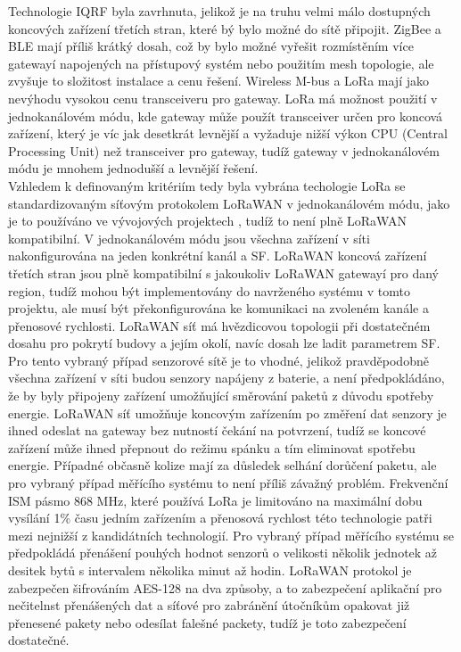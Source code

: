 Technologie IQRF byla zavrhnuta, jelikož je na truhu velmi málo dostupných koncových zařízení třetích stran, které bý bylo možné do sítě připojit. 
ZigBee a BLE mají příliš krátký dosah, což by bylo možné vyřešit rozmístěním více gatewayí napojených na přístupový systém nebo použitím mesh topologie, ale zvyšuje to složitost instalace a cenu řešení. 
Wireless M-bus a LoRa mají jako nevýhodu vysokou cenu transceiveru pro gateway. 
LoRa má možnost použití v jednokanálovém módu, kde gateway může použít transceiver určen pro koncová zařízení, který je víc jak desetkrát levnější a vyžaduje nižší výkon CPU (Central Processing Unit) než transceiver pro gateway, tudíž gateway v jednokanálovém módu je mnohem jednodušší a levnější řešení.
\\
Vzhledem k definovaným kritériím tedy byla vybrána techologie LoRa se standardizovaným síťovým protokolem LoRaWAN v jednokanálovém módu, jako je to používáno ve vývojových projektech \cite{Analysis of Propagation Link for Remote Weather}, tudíž to není plně LoRaWAN kompatibilní.
V jednokanálovém módu jsou všechna zařízení v síti nakonfigurována na jeden konkrétní kanál a SF.
LoRaWAN koncová zařízení třetích stran jsou plně kompatibilní s jakoukoliv LoRaWAN gatewayí pro daný region, tudíž mohou být implementovány do navrženého systému v tomto projektu, ale musí být překonfigurována ke komunikaci na zvoleném kanále a přenosové rychlosti. 
LoRaWAN síť má hvězdicovou topologii při dostatečném dosahu pro pokrytí budovy a jejím okolí, navíc dosah lze ladit parametrem SF. Pro tento vybraný případ senzorové sítě je to vhodné, jelikož pravděpodobně všechna zařízení v síti budou senzory napájeny z baterie, a není předpokládáno, že by byly připojeny zařízení umožňující směrování paketů z důvodu spotřeby energie. 
LoRaWAN síť umožňuje koncovým zařízením po změření dat senzory je ihned odeslat na gateway bez nutností čekání na potvrzení, tudíž se koncové zařízení může ihned přepnout do režimu spánku a tím eliminovat spotřebu energie. 
Případné občasně kolize mají za důsledek selhání dorůčení paketu, ale pro vybraný případ měřícího systému to není příliš závažný problém.
Frekvenční ISM pásmo 868 MHz, které používá LoRa je limitováno na maximální dobu vysílání 1\% času jedním zařízením a přenosová rychlost této technologie patři mezi nejnižší z kandidátních technologií. 
Pro vybraný případ měřícího systému se předpokládá přenášení pouhých hodnot senzorů o velikosti několik jednotek až desitek bytů s intervalem několika minut až hodin.
LoRaWAN protokol je zabezpečen šifrováním AES-128 na dva způsoby, a to zabezpečení aplikační pro nečitelnst přenášených dat a síťové pro zabránění útočníkům opakovat již přenesené pakety nebo odesílat falešné packety, tudíž je toto zabezpečení dostatečné. 

